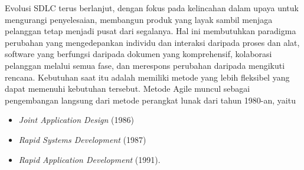 \newpage

Evolusi SDLC terus berlanjut, dengan fokus pada kelincahan dalam upaya untuk mengurangi penyelesaian,
membangun produk yang layak sambil menjaga pelanggan tetap menjadi pusat dari segalanya. 
Hal ini membutuhkan paradigma perubahan yang mengedepankan individu dan interaksi 
daripada proses dan alat, software yang berfungsi daripada dokumen yang komprehensif, 
kolaborasi pelanggan melalui semua fase, dan merespons perubahan daripada mengikuti rencana. 
Kebutuhan saat itu adalah memiliki metode yang lebih fleksibel yang dapat memenuhi kebutuhan tersebut. 
Metode Agile muncul sebagai pengembangan langsung dari metode perangkat lunak dari tahun 1980-an, yaitu

\begin{itemize}
    \item \emph{Joint Application Design} (1986) 
    \item \emph{Rapid Systems Development} (1987)
    \item \emph{Rapid Application Development} (1991).
\end{itemize}
